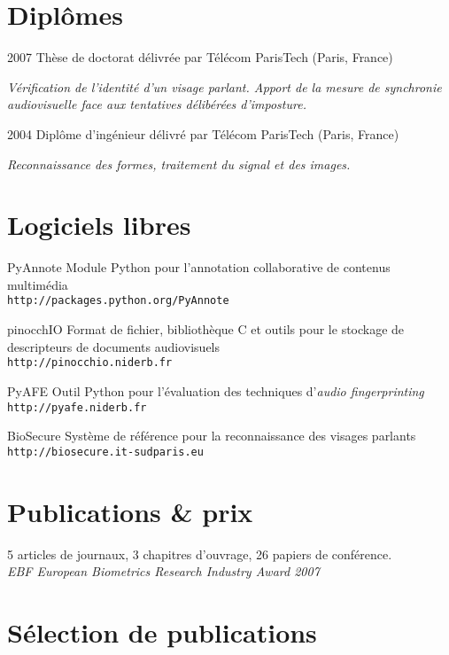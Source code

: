 \documentclass{simplecv}
\begin{document}
\section{Dipl\^{o}mes}

\begin{topic}
\item[2007] Th\`{e}se de doctorat d\'{e}livr\'{e}e par T\'{e}l\'{e}com ParisTech (Paris, France)

\emph{V{\'e}rification de l'identit{\'e} d'un visage parlant. Apport de la mesure de synchronie audiovisuelle face aux tentatives d{\'e}lib{\'e}r{\'e}es d'imposture.}

\item[2004] Dipl\^{o}me d'ing\'{e}nieur d\'{e}livr\'{e} par T\'{e}l\'{e}com ParisTech (Paris, France)

\emph{Reconnaissance des formes, traitement du signal et des images.}
\end{topic}

\section{Logiciels libres}
\begin{topic}
\item[PyAnnote] Module Python pour l'annotation collaborative de contenus multim\'{e}dia\\
\texttt{\small http://packages.python.org/PyAnnote}
\item[pinocchIO] Format de fichier, biblioth\`{e}que C et outils pour le stockage de descripteurs de documents audiovisuels\\
\texttt{\small http://pinocchio.niderb.fr}
\item[PyAFE] Outil Python pour l'\'{e}valuation des techniques d'\emph{audio fingerprinting}~\cite{Ramona2011}\\
\texttt{\small http://pyafe.niderb.fr}
\item[BioSecure] Syst\`{e}me de r\'{e}f\'{e}rence pour la reconnaissance des visages parlants~\cite{Bredin2006a}\\
\texttt{\small http://biosecure.it-sudparis.eu}
\end{topic}

\section{Publications \& prix}

5 articles de journaux, 3 chapitres d'ouvrage, 26 papiers de conf\'{e}rence.\\
\emph{EBF European Biometrics Research Industry Award 2007}~\cite{Bredin2008}

\section{S\'{e}lection de publications}
\nocite{Bredin2012,Bredin2012a,Ramona2011,Bredin2009,Bredin2008,Bredin2007,Argones-Rua2007a,Bredin2006a}


\end{document}
